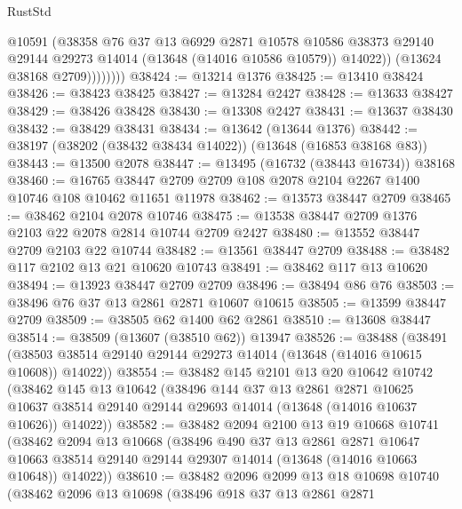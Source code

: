 \begin{lexlean}{RustStd}
\begin{coremodule}
                    @10591
                    (@38358
                      @76
                      @37
                      @13
                      @6929
                      @2871
                      @10578
                      @10586
                      @38373
                      @29140
                      @29144
                      @29273
                      @14014
                      (@13648 (@14016 @10586 @10579))
                      @14022))
                  (@13624 @38168 @2709))))))))
@38424 := @13214 @1376
@38425 := @13410 @38424
@38426 := @38423 @38425
@38427 := @13284 @2427
@38428 := @13633 @38427
@38429 := @38426 @38428
@38430 := @13308 @2427
@38431 := @13637 @38430
@38432 := @38429 @38431
@38434 := @13642 (@13644 @1376)
@38442 := @38197 (@38202 (@38432 @38434 @14022)) (@13648 (@16853 @38168 @83))
@38443 := @13500 @2078
@38447 := @13495 (@16732 (@38443 @16734)) @38168
@38460 := @16765 @38447 @2709 @2709 @108 @2078 @2104 @2267 @1400 @10746 @108 @10462 @11651 @11978
@38462 := @13573 @38447 @2709
@38465 := @38462 @2104 @2078 @10746
@38475 := @13538 @38447 @2709 @1376 @2103 @22 @2078 @2814 @10744 @2709 @2427
@38480 := @13552 @38447 @2709 @2103 @22 @10744
@38482 := @13561 @38447 @2709
@38488 := @38482 @117 @2102 @13 @21 @10620 @10743
@38491 := @38462 @117 @13 @10620
@38494 := @13923 @38447 @2709 @2709
@38496 := @38494 @86 @76
@38503 := @38496 @76 @37 @13 @2861 @2871 @10607 @10615
@38505 := @13599 @38447 @2709
@38509 := @38505 @62 @1400 @62 @2861
@38510 := @13608 @38447
@38514 := @38509 (@13607 (@38510 @62)) @13947
@38526 := @38488
    (@38491 (@38503 @38514 @29140 @29144 @29273 @14014 (@13648 (@14016 @10615 @10608)) @14022))
@38554 := @38482
    @145
    @2101
    @13
    @20
    @10642
    @10742
    (@38462
      @145
      @13
      @10642
      (@38496
        @144
        @37
        @13
        @2861
        @2871
        @10625
        @10637
        @38514
        @29140
        @29144
        @29693
        @14014
        (@13648 (@14016 @10637 @10626))
        @14022))
@38582 := @38482
    @2094
    @2100
    @13
    @19
    @10668
    @10741
    (@38462
      @2094
      @13
      @10668
      (@38496
        @490
        @37
        @13
        @2861
        @2871
        @10647
        @10663
        @38514
        @29140
        @29144
        @29307
        @14014
        (@13648 (@14016 @10663 @10648))
        @14022))
@38610 := @38482
    @2096
    @2099
    @13
    @18
    @10698
    @10740
    (@38462
      @2096
      @13
      @10698
      (@38496
        @918
        @37
        @13
        @2861
        @2871

\end{coremodule}
\end{lexlean}
